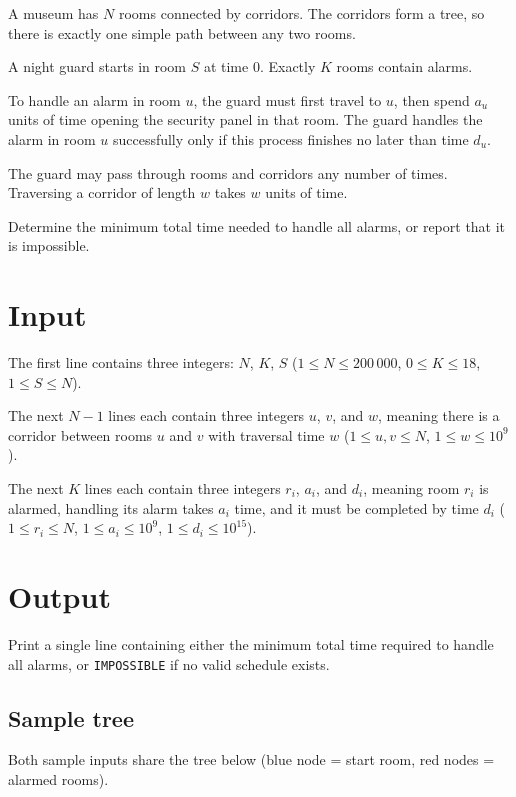 
A museum has $N$ rooms connected by corridors. The corridors form a tree, so there is exactly one simple path between any two rooms.

A night guard starts in room $S$ at time $0$. Exactly $K$ rooms contain alarms.

To handle an alarm in room $u$, the guard must first travel to $u$, then spend $a_u$ units of time opening the security panel in that room. The guard handles the alarm in room $u$ successfully only if this process finishes no later than time $d_u$.

The guard may pass through rooms and corridors any number of times. Traversing a corridor of length $w$ takes $w$ units of time.

Determine the minimum total time needed to handle all alarms, or report that it is impossible.

\section*{Input}

The first line contains three integers: $N$, $K$, $S$ ($1 \le N \le 200\,000$, $0 \le K \le 18$, $1 \le S \le N$).

The next $N-1$ lines each contain three integers $u$, $v$, and $w$, meaning there is a corridor between rooms $u$ and $v$ with traversal time $w$ ($1 \le u,v \le N$, $1 \le w \le 10^9$).

The next $K$ lines each contain three integers $r_i$, $a_i$, and $d_i$, meaning room $r_i$ is alarmed, handling its alarm takes $a_i$ time, and it must be completed by time $d_i$ ($1 \le r_i \le N$, $1 \le a_i \le 10^9$, $1 \le d_i \le 10^{15}$).

\section*{Output}

Print a single line containing either the minimum total time required to handle all alarms, or \texttt{IMPOSSIBLE} if no valid schedule exists.

\subsection*{Sample tree}

Both sample inputs share the tree below (blue node = start room, red nodes = alarmed rooms).

